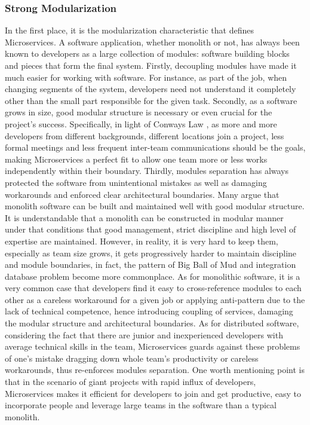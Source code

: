 \documentclass[a4paper]{book}
\begin{document}
\subsubsection{Strong Modularization}
In the first place, it is the modularization characteristic that defines Microservices. A software application, whether monolith or not, has always been known to developers as a large collection of modules: software building blocks and pieces that form the final system. Firstly, decoupling modules have made it much easier for working with software. For instance, as part of the job, when changing segments of the system, developers need not understand it completely other than the small part responsible for the given task. Secondly, as a software grows in size, good modular structure is necessary or even crucial for the project's success. Specifically, in light of Conways Law \cite{ConwayLaw}, as more and more developers from different backgrounds, different locations join a project, less formal meetings and less frequent inter-team communications should be the goals, making Microservices a perfect fit to allow one team more or less works independently within their boundary. Thirdly, modules separation has always protected the software from unintentional mistakes as well as damaging workarounds and enforced clear architectural boundaries. Many argue that monolith software can be built and maintained well with good modular structure. It is understandable that a monolith can be constructed in modular manner under that conditions that good management, strict discipline and high level of expertise are maintained. However, in reality, it is very hard to keep them, especially as team size grows, it gets progressively harder to maintain discipline and module boundaries, in fact, the pattern of Big Ball of Mud \cite{BigBallofMud} and integration database \cite{IntegrationDatabase} problem become more commonplace. As for monolithic software, it is a very common case that developers find it easy to cross-reference modules to each other as a careless workaround for a given job or applying anti-pattern due to the lack of technical competence, hence introducing coupling of services, damaging the modular structure and architectural boundaries. As for distributed software, considering the fact that there are junior and inexperienced developers with average technical skills in the team, Microservices guards against these problems of one's mistake dragging down whole team's productivity or careless workarounds, thus re-enforces modules separation. One worth mentioning point is that in the scenario of giant projects with rapid influx of developers, Microservices makes it efficient for developers to join and get productive, easy to incorporate people and leverage large teams in the software than a typical monolith. \cite{Lew14, MTO}
\end{document}
